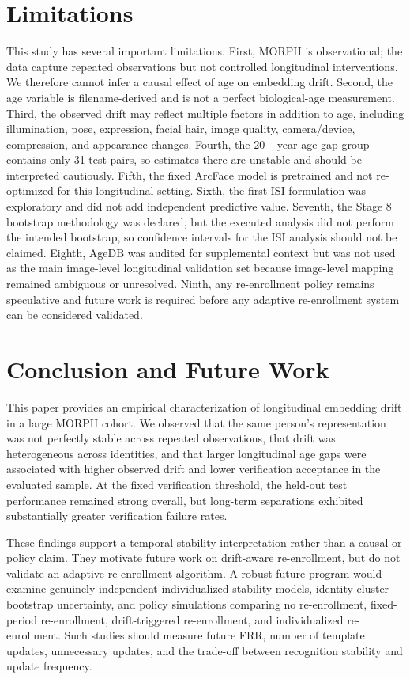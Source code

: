 \documentclass[conference]{IEEEtran}
\begin{document}
\section{Limitations}
\label{sec:limitations}
This study has several important limitations. First, MORPH is observational; the data capture repeated observations but not controlled longitudinal interventions. We therefore cannot infer a causal effect of age on embedding drift. Second, the age variable is filename-derived and is not a perfect biological-age measurement. Third, the observed drift may reflect multiple factors in addition to age, including illumination, pose, expression, facial hair, image quality, camera/device, compression, and appearance changes. Fourth, the 20+ year age-gap group contains only 31 test pairs, so estimates there are unstable and should be interpreted cautiously. Fifth, the fixed ArcFace model is pretrained and not re-optimized for this longitudinal setting. Sixth, the first ISI formulation was exploratory and did not add independent predictive value. Seventh, the Stage 8 bootstrap methodology was declared, but the executed analysis did not perform the intended bootstrap, so confidence intervals for the ISI analysis should not be claimed. Eighth, AgeDB was audited for supplemental context but was not used as the main image-level longitudinal validation set because image-level mapping remained ambiguous or unresolved. Ninth, any re-enrollment policy remains speculative and future work is required before any adaptive re-enrollment system can be considered validated.

\section{Conclusion and Future Work}
\label{sec:conclusion}
This paper provides an empirical characterization of longitudinal embedding drift in a large MORPH cohort. We observed that the same person's representation was not perfectly stable across repeated observations, that drift was heterogeneous across identities, and that larger longitudinal age gaps were associated with higher observed drift and lower verification acceptance in the evaluated sample. At the fixed verification threshold, the held-out test performance remained strong overall, but long-term separations exhibited substantially greater verification failure rates.

These findings support a temporal stability interpretation rather than a causal or policy claim. They motivate future work on drift-aware re-enrollment, but do not validate an adaptive re-enrollment algorithm. A robust future program would examine genuinely independent individualized stability models, identity-cluster bootstrap uncertainty, and policy simulations comparing no re-enrollment, fixed-period re-enrollment, drift-triggered re-enrollment, and individualized re-enrollment. Such studies should measure future FRR, number of template updates, unnecessary updates, and the trade-off between recognition stability and update frequency.
\end{document}
